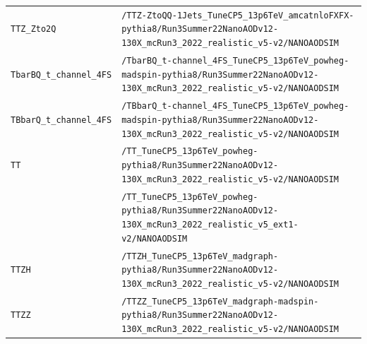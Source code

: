 \begin{longtable}{@{}>{\RaggedRight\arraybackslash}p{} >{\RaggedRight\arraybackslash}p{}@{}}
\texttt{TTZ\_\allowbreak{}Zto2Q} & \texttt{/\allowbreak{}TTZ-\allowbreak{}ZtoQQ-\allowbreak{}1Jets\_\allowbreak{}TuneCP5\_\allowbreak{}13p6TeV\_\allowbreak{}amcatnloFXFX-\allowbreak{}pythia8/\allowbreak{}Run3Summer22NanoAODv12-\allowbreak{}130X\_\allowbreak{}mcRun3\_\allowbreak{}2022\_\allowbreak{}realistic\_\allowbreak{}v5-\allowbreak{}v2/\allowbreak{}NANOAODSIM} \\
\addlinespace[2pt]
\texttt{TbarBQ\_\allowbreak{}t\_\allowbreak{}channel\_\allowbreak{}4FS} & \texttt{/\allowbreak{}TbarBQ\_\allowbreak{}t-\allowbreak{}channel\_\allowbreak{}4FS\_\allowbreak{}TuneCP5\_\allowbreak{}13p6TeV\_\allowbreak{}powheg-\allowbreak{}madspin-\allowbreak{}pythia8/\allowbreak{}Run3Summer22NanoAODv12-\allowbreak{}130X\_\allowbreak{}mcRun3\_\allowbreak{}2022\_\allowbreak{}realistic\_\allowbreak{}v5-\allowbreak{}v2/\allowbreak{}NANOAODSIM} \\
\addlinespace[2pt]
\texttt{TBbarQ\_\allowbreak{}t\_\allowbreak{}channel\_\allowbreak{}4FS} & \texttt{/\allowbreak{}TBbarQ\_\allowbreak{}t-\allowbreak{}channel\_\allowbreak{}4FS\_\allowbreak{}TuneCP5\_\allowbreak{}13p6TeV\_\allowbreak{}powheg-\allowbreak{}madspin-\allowbreak{}pythia8/\allowbreak{}Run3Summer22NanoAODv12-\allowbreak{}130X\_\allowbreak{}mcRun3\_\allowbreak{}2022\_\allowbreak{}realistic\_\allowbreak{}v5-\allowbreak{}v2/\allowbreak{}NANOAODSIM} \\
\addlinespace[2pt]
\texttt{TT} & \texttt{/\allowbreak{}TT\_\allowbreak{}TuneCP5\_\allowbreak{}13p6TeV\_\allowbreak{}powheg-\allowbreak{}pythia8/\allowbreak{}Run3Summer22NanoAODv12-\allowbreak{}130X\_\allowbreak{}mcRun3\_\allowbreak{}2022\_\allowbreak{}realistic\_\allowbreak{}v5-\allowbreak{}v2/\allowbreak{}NANOAODSIM} \\
 & \texttt{/\allowbreak{}TT\_\allowbreak{}TuneCP5\_\allowbreak{}13p6TeV\_\allowbreak{}powheg-\allowbreak{}pythia8/\allowbreak{}Run3Summer22NanoAODv12-\allowbreak{}130X\_\allowbreak{}mcRun3\_\allowbreak{}2022\_\allowbreak{}realistic\_\allowbreak{}v5\_\allowbreak{}ext1-\allowbreak{}v2/\allowbreak{}NANOAODSIM} \\
\addlinespace[2pt]
\texttt{TTZH} & \texttt{/\allowbreak{}TTZH\_\allowbreak{}TuneCP5\_\allowbreak{}13p6TeV\_\allowbreak{}madgraph-\allowbreak{}pythia8/\allowbreak{}Run3Summer22NanoAODv12-\allowbreak{}130X\_\allowbreak{}mcRun3\_\allowbreak{}2022\_\allowbreak{}realistic\_\allowbreak{}v5-\allowbreak{}v2/\allowbreak{}NANOAODSIM} \\
\addlinespace[2pt]
\texttt{TTZZ} & \texttt{/\allowbreak{}TTZZ\_\allowbreak{}TuneCP5\_\allowbreak{}13p6TeV\_\allowbreak{}madgraph-\allowbreak{}madspin-\allowbreak{}pythia8/\allowbreak{}Run3Summer22NanoAODv12-\allowbreak{}130X\_\allowbreak{}mcRun3\_\allowbreak{}2022\_\allowbreak{}realistic\_\allowbreak{}v5-\allowbreak{}v2/\allowbreak{}NANOAODSIM} \\

\end{longtable}
